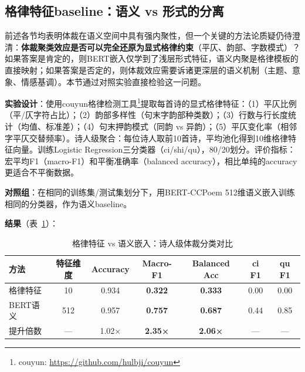 \documentclass[12pt,a4paper]{article}
\numberwithin{equation}{section}
\begin{document}
\subsection{格律特征baseline：语义 vs 形式的分离}
\label{sec:prosody-baseline}

前述各节均表明体裁在语义空间中具有强内聚性，但一个关键的方法论质疑仍待澄清：\textbf{体裁聚类效应是否可以完全还原为显式格律约束}（平仄、韵部、字数模式）？如果答案是肯定的，则BERT嵌入仅学到了浅层形式特征，语义内聚是格律模板的直接映射；如果答案是否定的，则体裁效应需要诉诸更深层的语义机制（主题、意象、情感基调）。本节通过对照实验直接检验这一问题。

\textbf{实验设计}：使用couyun格律检测工具\footnote{couyun: \url{https://github.com/hulbji/couyun}}提取每首诗的显式格律特征：（1）平仄比例（平/仄字符占比）；（2）韵部多样性（句末字韵部种类数）；（3）行数与行长度统计（均值、标准差）；（4）句末押韵模式（同韵 vs 异韵）；（5）平仄变化率（相邻字平仄交替频率）。诗人级聚合：每位诗人取前10首诗，平均池化得到10维格律特征向量。训练Logistic Regression三分类器（ci/shi/qu），80/20划分。评价指标：宏平均F1（macro-F1）和平衡准确率（balanced accuracy），相比单纯的accuracy更适合不平衡数据。

\textbf{对照组}：在相同的训练集/测试集划分下，用BERT-CCPoem 512维语义嵌入训练相同的分类器，作为语义baseline。

\textbf{结果}（表~\ref{tab:prosody-baseline}）：

\begin{table}[htbp]
  \centering
  \caption{格律特征 vs 语义嵌入：诗人级体裁分类对比}
  \label{tab:prosody-baseline}
  \begin{tabular}{lcccccc}
    \toprule
    方法 & 特征维度 & Accuracy & Macro-F1 & Balanced Acc & ci F1 & qu F1 \\
    \midrule
    格律特征 & 10 & 0.934 & \textbf{0.322} & \textbf{0.333} & 0.00 & 0.00 \\
    BERT语义 & 512 & 0.957 & \textbf{0.757} & \textbf{0.687} & 0.44 & 0.85 \\
    \midrule
    提升倍数 & --- & 1.02× & \textbf{2.35×} & \textbf{2.06×} & --- & --- \\
    \bottomrule
  \end{tabular}
\end{table}
\end{document}
